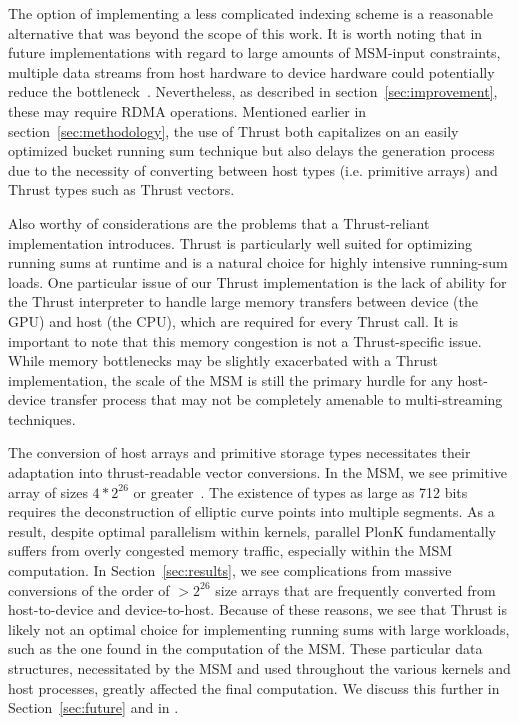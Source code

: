 \documentclass[sigconf]{acmart}
\begin{document}
The option of implementing a less complicated indexing scheme is
a reasonable alternative that was beyond the scope of this work. It is worth noting that in future implementations with regard to large amounts of MSM-input constraints, multiple data streams from host hardware to device hardware could potentially reduce the bottleneck~\cite{MSMGPU22}. Nevertheless, as described in section~\ref{sec:improvement}, these may require RDMA operations. Mentioned earlier in section~\ref{sec:methodology}, the use of Thrust both capitalizes on an easily optimized bucket running sum technique but also delays the generation process due to the necessity of converting between host types (i.e. primitive arrays) and Thrust types such as Thrust vectors. 

Also worthy of considerations are the problems that a Thrust-reliant implementation introduces. Thrust is particularly well suited for optimizing running sums at runtime and is a natural choice for highly intensive running-sum loads. One particular issue of our Thrust implementation is the lack of ability for the Thrust interpreter to handle large memory transfers between device (the GPU) and host (the CPU), which are required for every Thrust call. It is important to note that this memory congestion is not a Thrust-specific issue. While memory bottlenecks may be slightly exacerbated with a Thrust implementation, the scale of the MSM is still the primary hurdle for any host-device transfer process that may not be completely amenable to multi-streaming techniques. 

The conversion of host arrays and primitive storage types necessitates their adaptation into thrust-readable vector conversions.
In the MSM, we see primitive array of sizes $4 * 2^{26}$ or greater~\cite{Barretenberg}. 
The existence of types as large as 712 bits requires the deconstruction of elliptic curve points into multiple segments. As a result, despite optimal parallelism within kernels, parallel PlonK fundamentally suffers from overly congested memory traffic, especially within the MSM computation.
In Section~\ref{sec:results}, we see complications from massive conversions of the order of $> 2^{26}$ size arrays that are frequently converted from host-to-device and device-to-host. Because of these reasons, we see that Thrust is likely not an optimal choice for implementing running sums with large workloads, such as the one found in the computation of the MSM. These particular data structures, necessitated by the MSM and used throughout the various kernels and host processes, greatly affected the final computation.
We discuss this further in
Section~\ref{sec:future} and in \cite{nusratthesis}.
\end{document}
